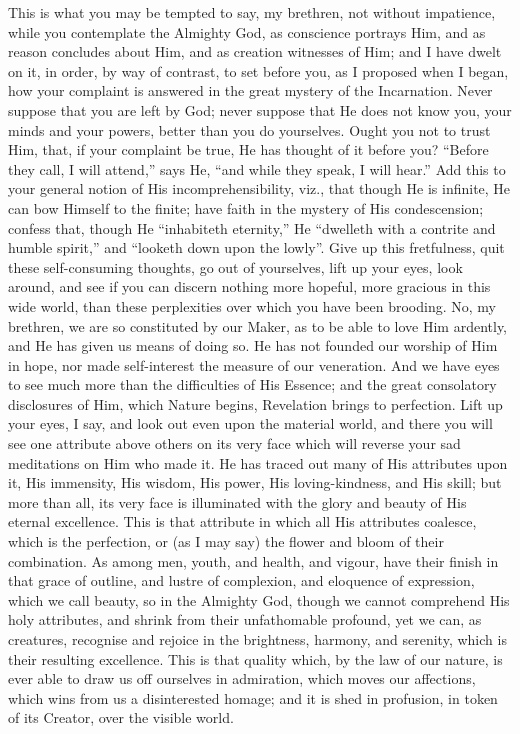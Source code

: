 This is what you may be tempted to say, my brethren, not without
impatience, while you contemplate the Almighty God, as conscience
portrays Him, and as reason concludes about Him, and as creation
witnesses of Him; and I have dwelt on it, in order, by way of
contrast, to set before you, as I proposed when I began, how your
complaint is answered in the great mystery of the Incarnation. Never
suppose that you are left by God; never suppose that He does not know
you, your minds and your powers, better than you do yourselves. Ought
you not to trust Him, that, if your complaint be true, He has thought
of it before you? ``Before they call, I will attend,'' says
He, ``and while they speak, I will hear.'' Add this to your
general notion of His incomprehensibility, viz., that though He is
infinite, He can bow Himself to the finite; have faith in the mystery
of His condescension; confess that, though He ``inhabiteth
eternity,'' He ``dwelleth with a contrite and humble
spirit,'' and ``looketh down upon the lowly''. Give up
this fretfulness, quit these self-consuming thoughts, go out of
yourselves, lift up your eyes, look around, and see if you can discern
nothing more hopeful, more gracious in this wide world, than these
perplexities over which you have been brooding. No, my brethren, we
are so constituted by our Maker, as to be able to love Him ardently,
and He has given us means of doing so. He has not founded our worship
of Him in hope, nor made self-interest the measure of our veneration.
And we have eyes to see much more than the difficulties of His
Essence; and the great consolatory disclosures of Him, which Nature
begins, Revelation brings to perfection. Lift up your eyes, I say, and
look out even upon the material world, and there you will see one
attribute above others on its very face which will reverse your sad
meditations on Him who made it. He has traced out many of His
attributes upon it, His immensity, His wisdom, His power, His
loving-kindness, and His skill; but more than all, its very face is
illuminated with the glory and beauty of His eternal excellence. This
is that attribute in which all His attributes coalesce, which is the
perfection, or (as I may say) the flower and bloom of their
combination. As among men, youth, and health, and vigour, have their
finish in that grace of outline, and lustre of complexion, and
eloquence of expression, which we call beauty, so in the Almighty God,
though we cannot comprehend His holy attributes, and shrink from their
unfathomable profound, yet we can, as creatures, recognise and rejoice
in the brightness, harmony, and serenity, which is their resulting
excellence. This is that quality which, by the law of our nature, is
ever able to draw us off ourselves in admiration, which moves our
affections, which wins from us a disinterested homage; and it is shed
in profusion, in token of its Creator, over the visible world.

